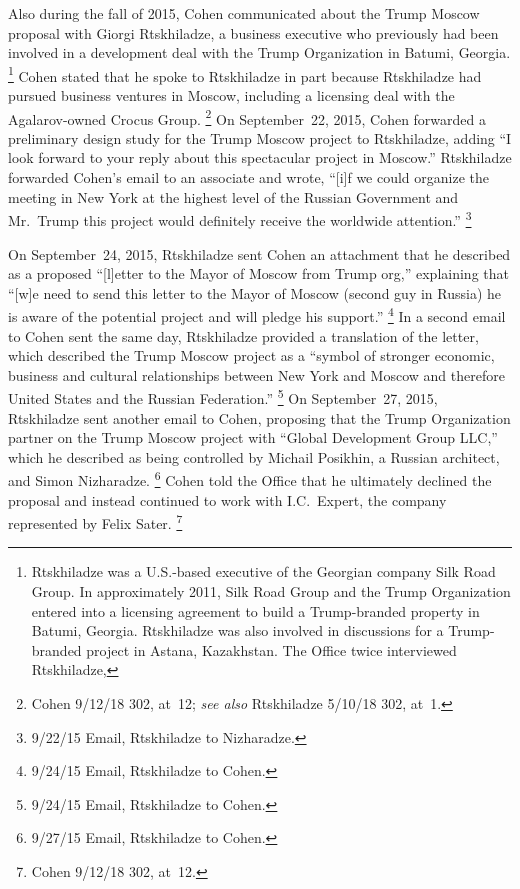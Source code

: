 Also during the fall of 2015, Cohen communicated about the Trump Moscow proposal with Giorgi Rtskhiladze, a business executive who previously had been involved in a development deal with the Trump Organization in Batumi, Georgia.%
\footnote{Rtskhiladze was a U.S.-based executive of the Georgian company Silk Road Group.
In approximately 2011, Silk Road Group and the Trump Organization entered into a licensing agreement to build a Trump-branded property in Batumi, Georgia.
Rtskhiladze was also involved in discussions for a Trump-branded project in Astana, Kazakhstan.
The Office twice interviewed Rtskhiladze, }
Cohen stated that he spoke to Rtskhiladze in part because Rtskhiladze had pursued business ventures in Moscow, including a licensing deal with the Agalarov-owned Crocus Group.%
\footnote{Cohen 9/12/18 302, at~12;
\textit{see also} Rtskhiladze 5/10/18 302, at~1.}
On September~22, 2015, Cohen forwarded a preliminary design study for the Trump Moscow project to Rtskhiladze, adding ``I look forward to your reply about this spectacular project in Moscow.''
Rtskhiladze forwarded Cohen's email to an associate and wrote, ``[i]f we could organize the meeting in New York at the highest level of the Russian Government and Mr.~Trump this project would definitely receive the worldwide attention.''%
\footnote{9/22/15 Email, Rtskhiladze to Nizharadze.}

On September~24, 2015, Rtskhiladze sent Cohen an attachment that he described as a proposed ``[l]etter to the Mayor of Moscow from Trump org,'' explaining that ``[w]e need to send this letter to the Mayor of Moscow (second guy in Russia) he is aware of the potential project and will pledge his support.''%
\footnote{9/24/15 Email, Rtskhiladze to Cohen.}
In a second email to Cohen sent the same day, Rtskhiladze provided a translation of the letter, which described the Trump Moscow project as a ``symbol of stronger economic, business and cultural relationships between New York and Moscow and therefore United States and the Russian Federation.''%
\footnote{9/24/15 Email, Rtskhiladze to Cohen.}
On September~27, 2015, Rtskhiladze sent another email to Cohen, proposing that the Trump Organization partner on the Trump Moscow project with ``Global Development Group LLC,'' which he described as being controlled by Michail Posikhin, a Russian architect, and Simon Nizharadze.%
\footnote{9/27/15 Email, Rtskhiladze to Cohen.}
Cohen told the Office that he ultimately declined the proposal and instead continued to work with I.C.~Expert, the company represented by Felix Sater.%
\footnote{Cohen 9/12/18 302, at~12.}

